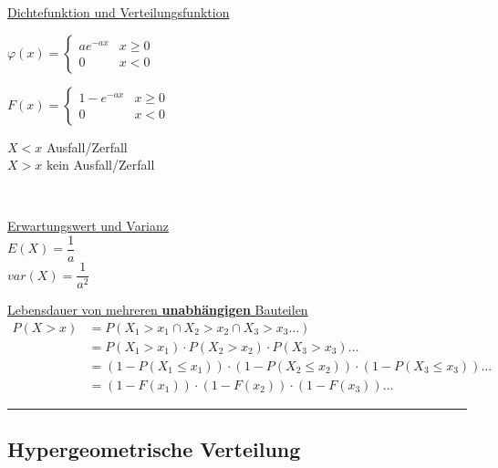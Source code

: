 \underline{Dichtefunktion und Verteilungsfunktion}\\
\begin{minipage}{5cm}
	$\varphi(x)=\begin{cases}
	a e^{-a x}  & x \geq 0\\
	0						& x < 0
	\end{cases}$
	
	$F(x)=\begin{cases}
	1-e^{-a x}  		& x \geq 0\\
	0	 					& x < 0
	\end{cases}$
\end{minipage} 
\begin{minipage}{4.5cm}
	$X < x$ Ausfall/Zerfall\\
	$X > x$ kein Ausfall/Zerfall
\end{minipage}\\
    
\begin{minipage}[t]{6cm}
  \underline{Erwartungswert und Varianz}\\[4pt]
  $E(X)=\dfrac{1}{a}$\\
  $var(X)=\dfrac{1}{a^2}$ 
\end{minipage}
\begin{minipage}[t]{9cm}
  \underline{Lebensdauer von mehreren \textbf{unabhängigen} Bauteilen}
  \begin{align}
    P(X>x) &= P(X_1>x_1 \cap X_2>x_2 \cap X_3>x_3 \ldots) \nonumber \\
    &= P(X_1>x_1) \cdot P(X_2>x_2) \cdot P(X_3>x_3) \ldots \nonumber \\
    &= (1-P(X_1\leq x_1)) \cdot (1-P(X_2\leq x_2)) \cdot (1-P(X_3\leq x_3)) \ldots \nonumber \\
    &= (1-F(x_1)) \cdot (1-F(x_2)) \cdot (1-F(x_3)) \ldots \nonumber
  \end{align}
\end{minipage}
		
	\hrule

\subsection{Hypergeometrische Verteilung}

